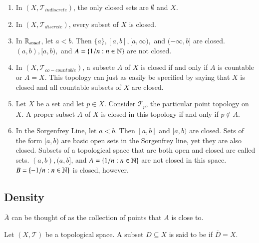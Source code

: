 \documentclass[12pt, a4paper, oneside, openright, titlepage]{book}
\begin{document}
\begin{eg}
    \leavevmode
    \begin{enumerate}
        \item In $(X,\mathcal{T}_{indiscrete})$, the only closed sets are $\emptyset$ and $X$.
        \item In $(X,\mathcal{T}_{discrete})$, every subset of $X$ is closed.
        \item In $\mathbb R_{usual}$, let $a<b$. Then $\{a\}, [a,b],[a,\infty),$ and $(-\infty,b]$ are closed. $(a,b), [a,b),$ and $A = \{1/n:n \in \mathbb N\}$ are not closed.
        \item In $(X,\mathcal{T}_{co-countable})$, a subsete $A$ of $X$ is closed if and only if $A$ is countable or $A = X$. This topology can just as easily be specified by saying that $X$ is closed and all countable subsets of $X$ are closed.
        \item Let $X$ be a set and let $p \in X$. Consider $\mathcal{T}_p$, the particular point topology on $X$. A proper subset $A$ of $X$ is closed in this topology if and only if $p \notin A$.
        \item In the Sorgenfrey Line, let $a < b$. Then $[a,b]$ and $[a,b)$ are closed. Sets of the form $[a,b)$ are basic open sets in the Sorgenfrey line, yet they are also closed. Subsets of a topological space that are both open and closed are called  sets. $(a,b),(a,b]$, and $A = \{1/n:n\in\mathbb N\}$ are not closed in this space. $B = \{-1/n:n \in\mathbb N\}$ is closed, however.
    \end{enumerate}
\end{eg}


\subsection{Density}


\begin{rmk}
    $\overline{A}$ can be thought of as the collection of points that $A$ is close to.
\end{rmk}


\begin{defn}
    Let $(X,\mathcal{T})$ be a topological space. A subset $D\subseteq X$ is said to be  if $\overline{D} = X$.
\end{defn}
\end{document}
